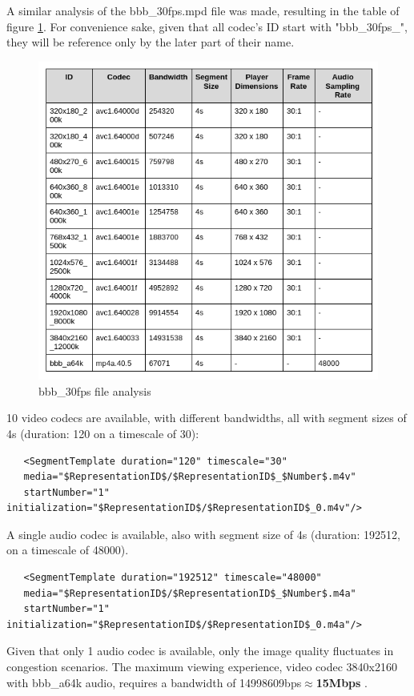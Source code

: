 \documentclass{article}
\begin{document}
A similar analysis of the bbb\_30fps.mpd file was made, resulting in the table 
of figure \ref{fig:BBBMPD_Analysis}. 
For convenience sake, given that all codec's ID start with "bbb\_30fps\_", they 
will be reference only by the later part of their name.
\begin{figure}[h!]
    \centering
    \includegraphics[width=0.9\linewidth,keepaspectratio]{BBBMPDTable}
    \caption{bbb\_30fps file analysis}
    \label{fig:BBBMPD_Analysis}
\end{figure}
\FloatBarrier

10 video codecs are available, with different bandwidths, all with segment 
sizes of 4s (duration: 120 on 
a timescale of 30):
\begin{verbatim}
   <SegmentTemplate duration="120" timescale="30" 
   media="$RepresentationID$/$RepresentationID$_$Number$.m4v" 
   startNumber="1" initialization="$RepresentationID$/$RepresentationID$_0.m4v"/>
\end{verbatim}
A single audio codec is available, also with segment size of 4s (duration: 
192512, on a timescale of 48000).
\begin{verbatim}
   <SegmentTemplate duration="192512" timescale="48000" 
   media="$RepresentationID$/$RepresentationID$_$Number$.m4a" 
   startNumber="1" initialization="$RepresentationID$/$RepresentationID$_0.m4a"/>
\end{verbatim}

Given that only 1 audio codec is available, only the image quality fluctuates 
in congestion scenarios. The maximum viewing experience,  
video codec 3840x2160 with bbb\_a64k audio, requires a bandwidth of 
14998609bps$\approx$\textbf{15Mbps} .
\end{document}
